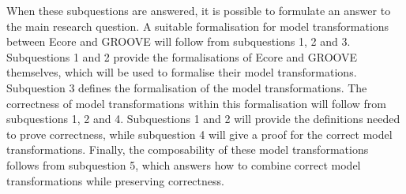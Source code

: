 When these subquestions are answered, it is possible to formulate an answer to the main research question. A suitable formalisation for model transformations between Ecore and GROOVE will follow from subquestions 1, 2 and 3. Subquestions 1 and 2 provide the formalisations of Ecore and GROOVE themselves, which will be used to formalise their model transformations. Subquestion 3 defines the formalisation of the model transformations. The correctness of model transformations within this formalisation will follow from subquestions 1, 2 and 4. Subquestions 1 and 2 will provide the definitions needed to prove correctness, while subquestion 4 will give a proof for the correct model transformations. Finally, the composability of these model transformations follows from subquestion 5, which answers how to combine correct model transformations while preserving correctness.